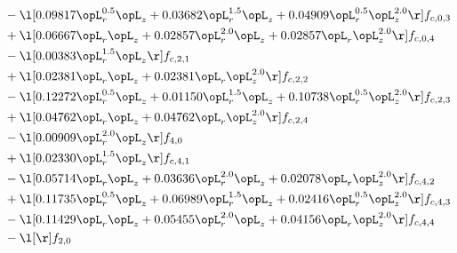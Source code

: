 \begin{alignat}{2}
& - \l[  0.09817 \opL_r^{0.5} \opL_z +  0.03682 \opL_r^{1.5} \opL_z +  0.04909 \opL_r^{0.5} \opL_z^{2.0}  \r] f_{c,0,3} \nonumber \\ 
& + \l[  0.06667 \opL_r \opL_z +  0.02857 \opL_r^{2.0} \opL_z +  0.02857 \opL_r \opL_z^{2.0}  \r] f_{c,0,4} \nonumber \\ 
& - \l[  0.00383 \opL_r^{1.5} \opL_z  \r] f_{c,2,1} \nonumber \\ 
& + \l[  0.02381 \opL_r \opL_z +  0.02381 \opL_r \opL_z^{2.0}  \r] f_{c,2,2} \nonumber \\ 
& - \l[  0.12272 \opL_r^{0.5} \opL_z +  0.01150 \opL_r^{1.5} \opL_z +  0.10738 \opL_r^{0.5} \opL_z^{2.0}  \r] f_{c,2,3} \nonumber \\ 
& + \l[  0.04762 \opL_r \opL_z +  0.04762 \opL_r \opL_z^{2.0}  \r] f_{c,2,4} \nonumber \\ 
& - \l[  0.00909 \opL_r^{2.0} \opL_z  \r] f_{4,0} \nonumber \\ 
& + \l[  0.02330 \opL_r^{1.5} \opL_z  \r] f_{c,4,1} \nonumber \\ 
& - \l[  0.05714 \opL_r \opL_z +  0.03636 \opL_r^{2.0} \opL_z +  0.02078 \opL_r \opL_z^{2.0}  \r] f_{c,4,2} \nonumber \\ 
& + \l[  0.11735 \opL_r^{0.5} \opL_z +  0.06989 \opL_r^{1.5} \opL_z +  0.02416 \opL_r^{0.5} \opL_z^{2.0}  \r] f_{c,4,3} \nonumber \\ 
& - \l[  0.11429 \opL_r \opL_z +  0.05455 \opL_r^{2.0} \opL_z +  0.04156 \opL_r \opL_z^{2.0}  \r] f_{c,4,4} \nonumber \\ 
& - \l[  \r] f_{2,0} \nonumber \\ 
\end{alignat} 


